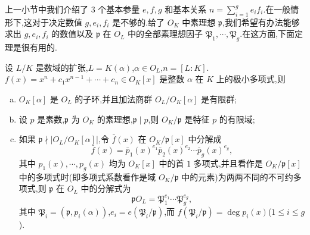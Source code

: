 上一小节中我们介绍了 $3$ 个基本参量 $e, f, g$ 和基本关系 $n=\sum_{i=1}^{g}e_if_i$.在一般情形下,这对于决定数值 $g, e_i, f_i$ 是不够的.给了 $O_K$ 中素理想 $\mathfrak{p}$,我们希望有办法能够求出 $g, e_i, f_i$ 的数值以及 $\mathfrak{p}$ 在 $O_L$ 中的全部素理想因子 $\mathfrak{P}_1,\cdots,\mathfrak{P}_g$.在这方面,下面定理是很有用的.

\begin{theorem}\label{thm:2.7}
设 $L/K$ 是数域的扩张,$L=K(\alpha)$,$\alpha\in O_L$,$n=[L:K]$.$f(x)=x^n+c_1x^{n-1}+\cdots+c_n\in O_K[x]$ 是整数 $\alpha$ 在 $K$ 上的极小多项式,则
\begin{enumerate}[(a)]
  \item $O_K[\alpha]$ 是 $O_L$ 的子环,并且加法商群 $O_L/O_K[\alpha]$ 是有限群;
  \item 设 $p$ 是素数,$\mathfrak{p}$ 为 $O_K$ 的素理想,$\mathfrak{p}\mid p$,则 $O_K/\mathfrak{p}$ 是特征 $p$ 的有限域;
  \item 如果 $\mathfrak{p}\nmid|O_L/O_K[\alpha]|$,令 $\bar{f}(x)$ 在 $O_K/\mathfrak{p}[x]$ 中分解成
        \[
          \bar{f}(x)=\bar{p}_1(x)^{e_1}\bar{p}_2(x)^{e_2}\cdots\bar{p}_g(x)^{e_g},
        \]
        其中 $p_1(x),\cdots,p_g(x)$ 均为 $O_K[x]$ 中的首 $1$ 多项式,并且看作是 $O_K/\mathfrak{p}[x]$ 中的多项式时(即多项式系数看作是域 $O_K/\mathfrak{p}$ 中的元素)为两两不同的不可约多项式,则 $\mathfrak{p}$ 在 $O_L$ 中的分解式为
        \[
          \mathfrak{p}O_L=\mathfrak{P}_1^{e_1}\cdots\mathfrak{P}_g^{e_g},
        \]
        其中 $\mathfrak{P}_i=(\mathfrak{p},p_i(\alpha))$,$e_i=e(\mathfrak{P}_i/\mathfrak{p})$,而 $f(\mathfrak{P}_i/\mathfrak{p})=\deg p_i(x)$($1\leqslant i\leqslant g$).
\end{enumerate}
\end{theorem}

